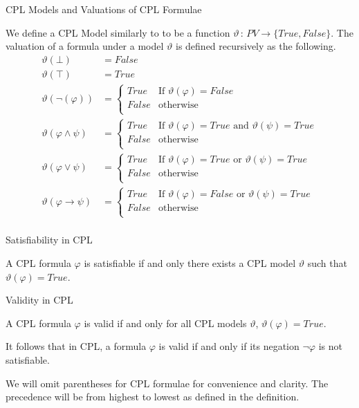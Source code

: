 \documentclass{llncs}
\begin{document}
\begin{definition}{CPL Models and Valuations of CPL Formulae}\label{CPL Model}

We define a CPL Model similarly to \cite{kelly2009revised} to be a function
$\vartheta \, : \, PV \rightarrow \{True, False\}$. The valuation of a formula
under a model $\vartheta$ is defined recursively as the following.
%
\begin{align*}
\vartheta (\bot) &= False \\
\vartheta (\top) &= True \\
\vartheta (\neg(\varphi)) &=
\begin{cases}
True & \textrm{If } \vartheta(\varphi) = False \\
False & \textrm{otherwise} \\
\end{cases} \\
\vartheta (\varphi \wedge \psi) &=
\begin{cases}
True & \textrm{If } \vartheta(\varphi) = True \textrm{ and } \vartheta(\psi) =
True \\
False & \textrm{otherwise} \\
\end{cases} \\
\vartheta (\varphi \vee \psi) &=
\begin{cases}
True & \textrm{If } \vartheta(\varphi) = True \textrm{ or } \vartheta(\psi) =
True \\
False & \textrm{otherwise} \\
\end{cases} \\
\vartheta (\varphi \rightarrow \psi) &=
\begin{cases}
True & \textrm{If } \vartheta(\varphi) = False \textrm{ or } \vartheta(\psi) =
True \\
False & \textrm{otherwise} \\
\end{cases} \\
\end{align*}
\end{definition}
\begin{definition}{Satisfiability in CPL}\label{Satisfiability in CPL}

A CPL formula $\varphi$ is satisfiable if and only there exists a CPL model
$\vartheta$ such that $\vartheta(\varphi) = True$.
\end{definition}
\begin{definition}{Validity in CPL}\label{Validity in CPL}

A CPL formula $\varphi$ is valid if and only for all CPL models
$\vartheta$, $\vartheta(\varphi) = True$.

It follows that in CPL, a formula $\varphi$ is valid if and only if its
negation $\neg \varphi$ is not satisfiable.
\end{definition}
%
We will omit parentheses for CPL formulae for convenience and clarity. The
precedence will be from highest to lowest as defined in the definition.
%
\end{document}
